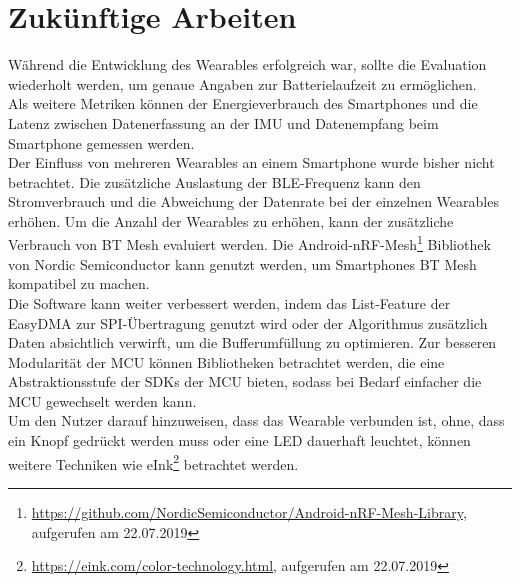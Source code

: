 \section{Zukünftige Arbeiten}
Während die Entwicklung des Wearables erfolgreich war, sollte die Evaluation wiederholt werden, um genaue Angaben zur Batterielaufzeit zu ermöglichen.\\
Als weitere Metriken können der Energieverbrauch des Smartphones und die Latenz zwischen Datenerfassung an der IMU und Datenempfang beim Smartphone gemessen werden.\\
Der Einfluss von mehreren Wearables an einem Smartphone wurde bisher nicht betrachtet.
Die zusätzliche Auslastung der BLE-Frequenz kann den Stromverbrauch und die Abweichung der Datenrate bei der einzelnen Wearables erhöhen.
Um die Anzahl der Wearables zu erhöhen, kann der zusätzliche Verbrauch von BT Mesh evaluiert werden.
Die Android-nRF-Mesh\footnote{\url{https://github.com/NordicSemiconductor/Android-nRF-Mesh-Library}, aufgerufen am 22.07.2019} Bibliothek von Nordic Semiconductor kann genutzt werden, um Smartphones BT Mesh kompatibel zu machen.\\
Die Software kann weiter verbessert werden, indem das List-Feature der EasyDMA zur SPI-Übertragung \cite{datasheet_nrf52832} genutzt wird oder der Algorithmus zusätzlich Daten absichtlich verwirft, um die Bufferumfüllung zu optimieren.
Zur besseren Modularität der MCU können Bibliotheken betrachtet werden, die eine Abstraktionsstufe der SDKs der MCU bieten, sodass bei Bedarf einfacher die MCU gewechselt werden kann.\\
Um den Nutzer darauf hinzuweisen, dass das Wearable verbunden ist, ohne, dass ein Knopf gedrückt werden muss oder eine LED dauerhaft leuchtet, können weitere Techniken wie eInk\footnote{\url{https://eink.com/color-technology.html}, aufgerufen am 22.07.2019} betrachtet werden.
